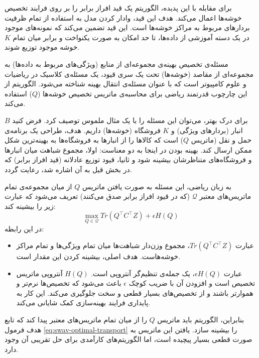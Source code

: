 برای مقابله با این پدیده، الگوریتم 
یک قید افراز برابر
را بر روی فرایند تخصیص خوشه‌ها اعمال می‌کند. هدف این قید، وادار کردن مدل به استفاده از تمام ظرفیت بردارهای مربوط به مراکز خوشه‌ها است. این قید تضمین می‌کند که نمونه‌های موجود در یک دسته آموزشی از داده‌ها، تا حد امکان به صورت یکنواخت و برابر میان تمام 
$K$
خوشه موجود توزیع شوند.

مسئله‌ی تخصیص بهینه‌ی مجموعه‌ای از منابع (ویژگی‌های مربوط به داده‌ها) به مجموعه‌ای از مقاصد (خوشه‌ها) تحت یک سری قیود، یک مسئله‌ی کلاسیک در ریاضیات و علوم کامپیوتر است که با عنوان مسئله‌ی انتقال بهینه
شناخته می‌شود. الگوریتم  از این چارچوب قدرتمند ریاضی برای محاسبه‌ی ماتریس تخصیص خوشه‌ها
($Q$) استفاده می‌کند.

برای درک بهتر، می‌توان این مسئله را با یک مثال ملموس توصیف کرد. فرض کنید 
$B$
 انبار (بردارهای ویژگی) و 
$K$
 فروشگاه (خوشه‌ها) داریم. هدف، طراحی یک برنامه‌ی حمل و نقل
 (ماتریس $Q$)
 است که کالاها را از انبارها به فروشگاه‌ها به بهینه‌ترین شکل ممکن ارسال کند. بهینه بودن در اینجا به دو معناست: اولا، مجموع شباهت میان انبارها و فروشگاه‌های متناظرشان بیشینه شود و ثانيا، قیود توزیع عادلانه (قید افراز برابر) که در بخش قبل به آن اشاره شد، رعایت گردد.

 به زبان ریاضی، این مسئله به صورت یافتن ماتریس $Q$ از میان مجموعه‌ی تمام ماتریس‌های معتبر 
$\mathcal{Q}$
(که در قیود افراز برابر صدق می‌کنند) تعریف می‌شود که عبارت زیر را بیشینه کند:
\begin{equation}
\max_{Q \in \mathcal{Q}} Tr(Q^\top C^\top Z) + \epsilon H(Q)
\label{eq:swav-optimal-transport}
\end{equation}
در این رابطه:
\begin{itemize}
    \item عبارت
    $Tr(Q^\top C^\top Z)$،
    مجموع وزن‌دار شباهت‌ها میان تمام ویژگی‌ها و تمام مراکز خوشه‌هاست. هدف اصلی، بیشینه کردن این مقدار است.
    \item عبارت
    $\epsilon H(Q)$،
    یک جمله‌ی تنظیم‌گر آنتروپی است.
    $H(Q)$ آنتروپی ماتریس تخصیص است و افزودن آن با ضریب کوچک $ϵ$ باعث می‌شود که تخصیص‌ها نرم‌تر و هموارتر باشند و از تخصیص‌های بسیار قطعی و سخت جلوگیری می‌کند. این کار به پایداری فرایند بهینه‌سازی کمک شایانی می‌کند.
\end{itemize}
بنابراین، الگوریتم باید ماتریس 
$Q$
را از میان تمام ماتریس‌های معتبر پیدا کند که تابع هدف فرمول \ref{eq:swav-optimal-transport}
را بیشینه سازد. یافتن این ماتریس به صورت قطعی بسیار پیچیده است، اما الگوریتم‌های کارآمدی برای حل تقریبی آن وجود دارد.

